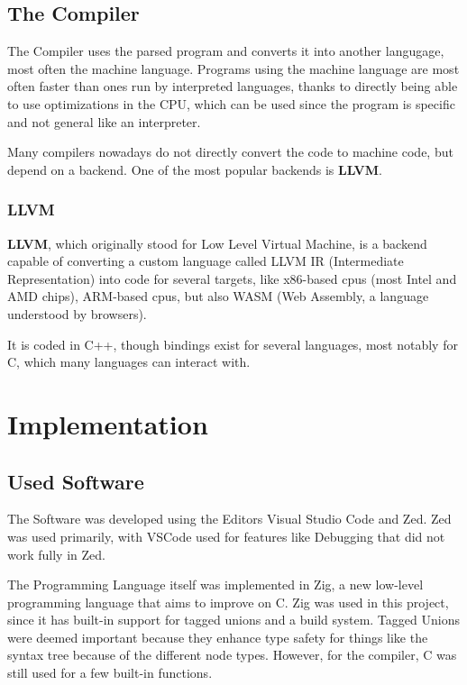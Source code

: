 \documentclass[12pt]{article}
\begin{document}
\subsection{The Compiler}
The Compiler uses the parsed program and converts it into another langugage,
most often the machine language. Programs using the machine language are most often
faster than ones run by interpreted languages, thanks to directly being able to use
optimizations in the CPU, which can be used since the program is specific
and not general like an interpreter.

Many compilers nowadays do not directly convert the code to machine code,
but depend on a backend. One of the most popular backends is \textbf{LLVM}.

\subsubsection{LLVM}
\textbf{LLVM}, which originally stood for Low Level Virtual Machine, is
a backend capable of converting a custom language called
LLVM IR (Intermediate Representation) into code for several targets,
like x86-based cpus (most Intel and AMD chips), ARM-based cpus, but also
WASM (Web Assembly, a language understood by browsers).

It is coded in C++, though bindings exist for several languages, most notably
for C, which many languages can interact with.

\section{Implementation}

\subsection{Used Software}

The Software was developed using the Editors Visual Studio Code and Zed.
Zed was used primarily, with VSCode used for features like Debugging
that did not work fully in Zed.

The Programming Language itself was implemented in Zig, a new low-level programming
language that aims to improve on C. Zig was used in this project, since it has built-in
support for tagged unions and a build system. Tagged Unions were deemed important because they
enhance type safety for things like the syntax tree because of the different node types.
However, for the compiler, C was still used for
a few built-in functions.
\end{document}
